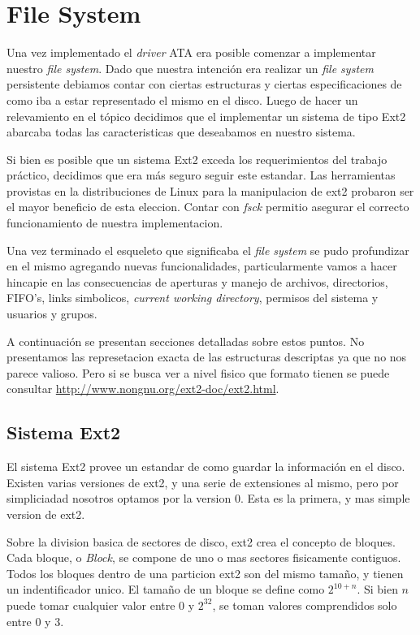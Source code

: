 \documentclass[a4paper,10pt]{article}
\begin{document}
\section{File System}
    
Una vez implementado el \textit{driver} ATA era posible comenzar a implementar nuestro \textit{file system}.
Dado que nuestra intención era realizar un \textit{file system} persistente debiamos contar con ciertas estructuras
y ciertas especificaciones de como iba a estar representado el mismo en el disco. Luego de hacer un relevamiento
en el tópico decidimos que el implementar un sistema de tipo Ext2 abarcaba todas las caracteristicas que deseabamos
en nuestro sistema. 

Si bien es posible que un sistema Ext2 exceda los requerimientos del trabajo práctico, decidimos que era más seguro seguir este estandar. 
Las herramientas provistas en la distribuciones de Linux para la manipulacion de ext2 probaron ser el mayor beneficio de esta eleccion.
Contar con \textit{fsck} permitio asegurar el correcto funcionamiento de nuestra implementacion.

Una vez terminado el esqueleto que significaba el \textit{file system} se pudo profundizar en el mismo agregando
nuevas funcionalidades, particularmente vamos a hacer hincapie en las consecuencias de aperturas y manejo de
archivos, directorios, FIFO's, links simbolicos, \textit{current working
directory}, permisos del sistema y usuarios y grupos.

A continuación se presentan secciones detalladas sobre estos puntos.
No presentamos las represetacion exacta de las estructuras descriptas ya que no nos parece valioso.
Pero si se busca ver a nivel fisico que formato tienen se puede consultar \url{http://www.nongnu.org/ext2-doc/ext2.html}.

\subsection{Sistema Ext2}
El sistema Ext2 provee un estandar de como guardar la información en el disco.
Existen varias versiones de ext2, y una serie de extensiones al mismo, pero por simpliciadad nosotros optamos por la version 0.
Esta es la primera, y mas simple version de ext2.

Sobre la division basica de sectores de disco, ext2 crea el concepto de bloques.
Cada bloque, o \textit{Block}, se compone de uno o mas sectores fisicamente contiguos.
Todos los bloques dentro de una particion ext2 son del mismo tamaño, y tienen un indentificador unico.
El tamaño de un bloque se define como $ 2^{10 + n} $.
Si bien $n$ puede tomar cualquier valor entre 0 y $ 2^{32} $, se toman valores comprendidos solo entre 0 y 3.
\end{document}
